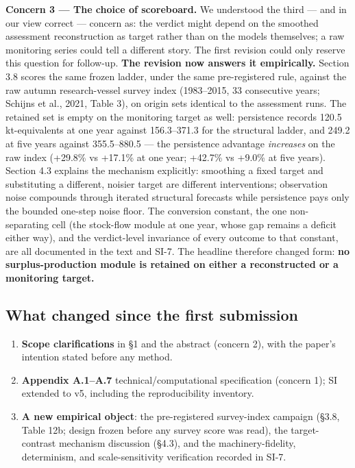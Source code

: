 \documentclass[11pt]{article}
\providecommand{\tightlist}{\setlength{\itemsep}{0.2em}\setlength{\parskip}{0pt}}
\begin{document}
\textbf{Concern 3 --- The choice of scoreboard.} We understood the third
--- and in our view correct --- concern as: the verdict might depend on
the smoothed assessment reconstruction as target rather than on the
models themselves; a raw monitoring series could tell a different story.
The first revision could only reserve this question for follow-up.
\textbf{The revision now answers it empirically.} Section 3.8 scores the
same frozen ladder, under the same pre-registered rule, against the raw
autumn research-vessel survey index (1983--2015, 33 consecutive years;
Schijns et al., 2021, Table 3), on origin sets identical to the
assessment runs. The retained set is empty on the monitoring target as
well: persistence records 120.5 kt-equivalents at one year against
156.3--371.3 for the structural ladder, and 249.2 at five years against
355.5--880.5 --- the persistence advantage \emph{increases} on the raw
index (+29.8\% vs +17.1\% at one year; +42.7\% vs +9.0\% at five years).
Section 4.3 explains the mechanism explicitly: smoothing a fixed target
and substituting a different, noisier target are different
interventions; observation noise compounds through iterated structural
forecasts while persistence pays only the bounded one-step noise floor.
The conversion constant, the one non-separating cell (the stock-flow
module at one year, whose gap remains a deficit either way), and the
verdict-level invariance of every outcome to that constant, are all
documented in the text and SI-7. The headline therefore changed form:
\textbf{no surplus-production module is retained on either a
reconstructed or a monitoring target.}

\subsection{What changed since the first
submission}\label{what-changed-since-the-first-submission}

\begin{enumerate}
\def\labelenumi{\arabic{enumi}.}
\tightlist
\item
  \textbf{Scope clarifications} in §1 and the abstract (concern 2), with
  the paper's intention stated before any method.
\item
  \textbf{Appendix A.1--A.7} technical/computational specification
  (concern 1); SI extended to v5, including the reproducibility
  inventory.
\item
  \textbf{A new empirical object}: the pre-registered survey-index
  campaign (§3.8, Table 12b; design frozen before any survey score was
  read), the target-contrast mechanism discussion (§4.3), and the
  machinery-fidelity, determinism, and scale-sensitivity verification
  recorded in SI-7.
\end{enumerate}
\end{document}
